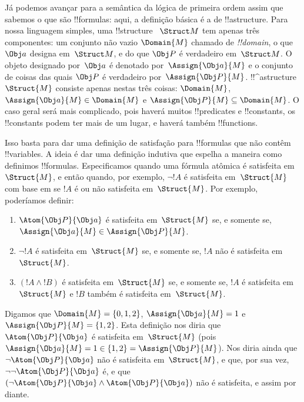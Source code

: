\documentclass[../../../include/open-logic-section]{subfiles}
\begin{document}


Já podemos avançar para a semântica da lógica de primeira ordem assim
que sabemos o que são !!{formula}s: aqui, a definição básica é a de
!!a{structure}. Para nossa linguagem simples, uma !!{structure}
~$\Struct M$ tem apenas três componentes: um conjunto não vazio
$\Domain{M}$ chamado de \emph{!!{domain}}, o que $\Obj a$ designa
em~$\Struct M$, e do que $\Obj P$ é verdadeiro em~$\Struct M$.  O
objeto designado por~$\Obj a$ é denotado por~$\Assign{\Obj a}{M}$ e o
conjunto de coisas das quais $\Obj P$ é verdadeiro
por~$\Assign{\Obj P}{M}$. !!^a{structure}~$\Struct{M}$ consiste
apenas nestas três coisas: $\Domain{M}$, $\Assign{\Obj a}{M} \in
\Domain{M}$ e $\Assign{\Obj P}{M} \subseteq \Domain{M}$. O caso geral
será mais complicado, pois haverá muitos !!{predicate}s e
!!{constant}s, os !!{constant}s podem ter mais de um lugar, e haverá
também !!{function}s.

Isso basta para dar uma definição de satisfação para !!{formula}s que
não contêm !!{variable}s.  A ideia é dar uma definição indutiva que
espelha a maneira como definimos !!{formula}s. Especificamos quando
uma fórmula atômica é satisfeita em~$\Struct{M}$, e então quando, por
exemplo, $\lnot !A$ é satisfeita em~$\Struct{M}$ com base em se $!A$
é ou não satisfeita em~$\Struct{M}$. Por exemplo, poderíamos definir:
\begin{enumerate}
  \item $\Atom{\Obj P}{\Obj a}$ é satisfeita em~$\Struct{M}$ se, e
  somente se, $\Assign{\Obj a}{M} \in \Assign{\Obj P}{M}$.
  \item $\lnot !A$ é satisfeita em~$\Struct{M}$ se, e somente se, $!A$
  não é satisfeita em~$\Struct{M}$.
  \item $(!A \land !B)$ é satisfeita em~$\Struct{M}$ se, e somente se,
  $!A$ é satisfeita em~$\Struct{M}$ e $!B$ também é satisfeita
  em~$\Struct{M}$.
\end{enumerate}
Digamos que $\Domain{M} = \{0, 1, 2\}$, $\Assign{\Obj a}{M} = 1$ e
$\Assign{\Obj P}{M} = \{1, 2\}$. Esta definição nos diria que
$\Atom{\Obj P}{\Obj a}$ é satisfeita em~$\Struct{M}$ (pois $\Assign{\Obj
a}{M} = 1 \in \{1,2\} = \Assign{\Obj P}{M}$). Nos diria ainda que
$\lnot \Atom{\Obj P}{\Obj a}$ não é satisfeita em~$\Struct{M}$, e que,
por sua vez, $\lnot\lnot \Atom{\Obj P}{\Obj a}$ é, e que $(\lnot
\Atom{\Obj P}{\Obj a} \land \Atom{\Obj P}{\Obj a})$ não é satisfeita, e
assim por diante.
\end{document}
